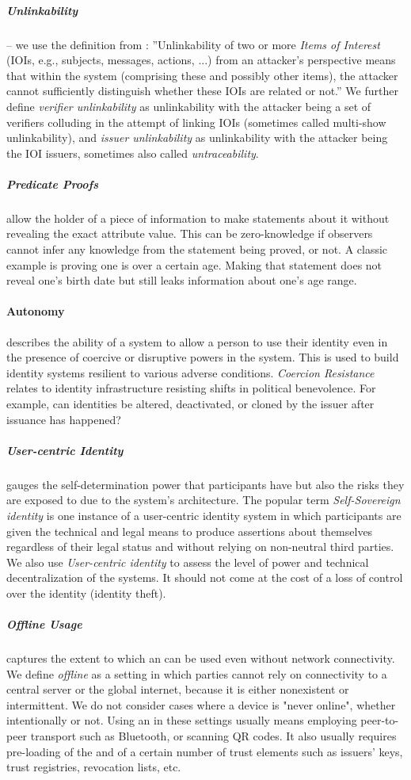 \subparagraph{Unlinkability} -- we use the definition from \cite{ph10}: ''Unlinkability of two or more \emph{Items of Interest} (IOIs, e.g., subjects, messages, actions, ...)
from an attacker’s perspective means that within the system (comprising these and
possibly other items), the attacker cannot sufficiently distinguish whether these IOIs are
related or not.''
We further define \emph{verifier unlinkability} as unlinkability with the attacker being a set of verifiers colluding in the attempt of linking IOIs (sometimes called multi-show unlinkability), and \emph{issuer unlinkability} as unlinkability with the attacker being the IOI issuers, sometimes also called \emph{untraceability}.


\subparagraph{Predicate Proofs} allow the holder of a piece of information to make statements about it without revealing the exact attribute value. This can be zero-knowledge if observers cannot infer any knowledge from the statement being proved, or not. A classic example is proving one is over a certain age. Making that statement does not reveal one's birth date but still leaks information about one's age range.


\paragraph{Autonomy} describes the ability of a system to allow a person to use their identity even in the presence of coercive or disruptive powers in the system. 
This is used to build identity systems resilient to various adverse conditions.
\emph{Coercion Resistance} relates to identity infrastructure resisting shifts in political benevolence. For example, can identities be altered, deactivated, or cloned by the issuer after issuance has happened?


\subparagraph{User-centric Identity} gauges the self-determination power that participants have but also the risks they are exposed to due to the system's architecture.
The popular term \emph{Self-Sovereign identity} is one instance of a user-centric identity system in which participants are given the technical and legal means to produce assertions about themselves regardless of their legal status and without relying on non-neutral third parties.
We also use \emph{User-centric identity} to assess the level of power and technical decentralization of the systems. 
It should not come at the cost of a loss of control over the identity (identity theft).

\subparagraph{Offline Usage} captures the extent to which an \eid{} can be used even without network connectivity.
We define \emph{offline} as a setting in which parties cannot rely on connectivity to a central server or the global internet, because it is either nonexistent or intermittent. We do not consider cases where a device is "never online", whether intentionally or not. Using an \eid{} in these settings usually means employing peer-to-peer transport such as Bluetooth, or scanning QR codes. It also usually requires pre-loading of the \eid and of a certain number of trust elements such as issuers' keys, trust registries, revocation lists, etc.

